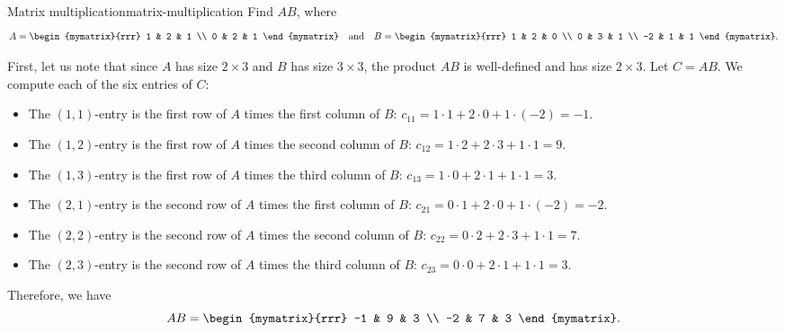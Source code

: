 \begin{example}{Matrix multiplication}{matrix-multiplication}
  Find $AB$, where
  \begin{equation*}
    A = \begin{mymatrix}{rrr}
      1 & 2 & 1 \\
      0 & 2 & 1
    \end{mymatrix}
    \quad\mbox{and}\quad
    B = \begin{mymatrix}{rrr}
      1 & 2 & 0 \\
      0 & 3 & 1 \\
      -2 & 1 & 1
    \end{mymatrix}.
  \end{equation*}
\end{example}

\begin{solution}
  First, let us note that since $A$ has size $2\times 3$ and $B$ has
  size $3\times 3$, the product $AB$ is well-defined and has size
  $2\times 3$. Let $C=AB$. We compute each of the six entries of $C$:
  \begin{itemize}
  \item The $(1,1)$-entry is the first row of $A$ times the first
    column of $B$: $c_{11} = 1\cdot 1+2\cdot 0+1\cdot(-2) = -1$.
  \item The $(1,2)$-entry is the first row of $A$ times the second
    column of $B$: $c_{12} = 1\cdot 2+2\cdot 3+1\cdot 1 = 9$.
  \item The $(1,3)$-entry is the first row of $A$ times the third
    column of $B$: $c_{13} = 1\cdot 0+2\cdot 1+1\cdot 1 = 3$.
  \item The $(2,1)$-entry is the second row of $A$ times the first
    column of $B$: $c_{21} = 0\cdot 1+2\cdot 0+1\cdot(-2) = -2$.
  \item The $(2,2)$-entry is the second row of $A$ times the second
    column of $B$: $c_{22} = 0\cdot 2+2\cdot 3+1\cdot 1 = 7$.
  \item The $(2,3)$-entry is the second row of $A$ times the third
    column of $B$: $c_{23} = 0\cdot 0+2\cdot 1+1\cdot 1 = 3$.
  \end{itemize}
  Therefore, we have
  \begin{equation*}
    AB = \begin{mymatrix}{rrr}
      -1 & 9 & 3 \\
      -2 & 7 & 3
    \end{mymatrix}.
  \end{equation*}
\end{solution}

